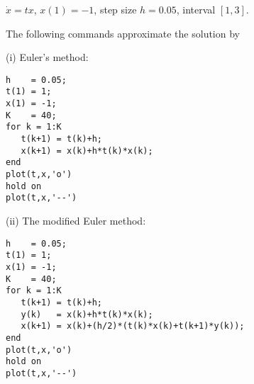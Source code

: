 \documentclass{ximera}
\begin{document}
\begin{computerExercise} \label{c15.1.5c}
$\dot x = tx$, $x(1)=-1$, step size $h=0.05$, interval $[1,3]$.

\begin{solution}
The following \Matlab commands approximate the solution by

(i) Euler's method:
\begin{verbatim}
h    = 0.05;
t(1) = 1;
x(1) = -1;
K    = 40;
for k = 1:K
   t(k+1) = t(k)+h;
   x(k+1) = x(k)+h*t(k)*x(k);
end
plot(t,x,'o')
hold on
plot(t,x,'--')
\end{verbatim}

(ii) The modified Euler method:
\begin{verbatim}
h    = 0.05;
t(1) = 1;
x(1) = -1;
K    = 40;
for k = 1:K
   t(k+1) = t(k)+h;
   y(k)   = x(k)+h*t(k)*x(k);
   x(k+1) = x(k)+(h/2)*(t(k)*x(k)+t(k+1)*y(k));
end
plot(t,x,'o')
hold on
plot(t,x,'--')
\end{verbatim}



\end{solution}
\end{computerExercise}
\end{document}
